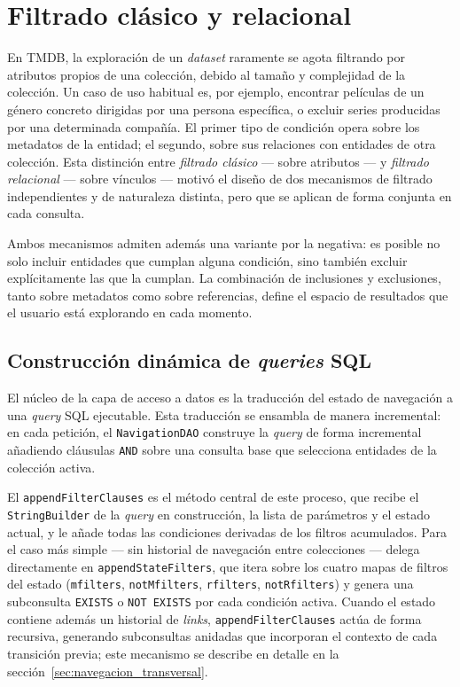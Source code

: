 \section{Filtrado clásico y relacional}
\label{sec:filtrado}

En TMDB, la exploración de un \textit{dataset} raramente se agota filtrando por atributos propios de
una colección, debido al tamaño y complejidad de la colección. Un caso de uso habitual es, por ejemplo,
encontrar películas de un género concreto dirigidas por una persona específica, o excluir series producidas por una
determinada compañía. El primer tipo de condición opera sobre los metadatos de la entidad; el segundo,
sobre sus relaciones con entidades de otra colección. Esta distinción entre \textit{filtrado
clásico} --- sobre atributos --- y \textit{filtrado relacional} --- sobre vínculos --- motivó el
diseño de dos mecanismos de filtrado independientes y de naturaleza distinta, pero que se aplican de forma
conjunta en cada consulta.

Ambos mecanismos admiten además una variante por la negativa: es posible no solo incluir entidades
que cumplan alguna condición, sino también excluir explícitamente las que la cumplan. La combinación de
inclusiones y exclusiones, tanto sobre metadatos como sobre referencias, define el espacio de
resultados que el usuario está explorando en cada momento.

    \subsection{Construcción dinámica de \textit{queries} SQL}

El núcleo de la capa de acceso a datos es la traducción del estado de navegación a una \textit{query}
SQL ejecutable. Esta traducción se ensambla de manera incremental: en cada petición, el
\texttt{NavigationDAO} construye la \textit{query} de forma incremental añadiendo cláusulas
\texttt{AND} sobre una consulta base que selecciona entidades de la colección activa.

El \texttt{appendFilterClauses} es el método central de este proceso, que recibe el  
\texttt{StringBuilder} de la \textit{query} en construcción, la lista de parámetros y el estado
actual, y le añade todas las condiciones derivadas de los filtros acumulados. Para el caso
más simple --- sin historial de navegación entre colecciones --- delega directamente en
\texttt{appendStateFilters}, que itera sobre los cuatro mapas de filtros del estado
(\texttt{mfilters}, \texttt{notMfilters}, \texttt{rfilters}, \texttt{notRfilters}) y
genera una subconsulta \texttt{EXISTS} o \texttt{NOT EXISTS} por cada condición activa.
Cuando el estado contiene además un historial de \textit{links}, \texttt{appendFilterClauses}
actúa de forma recursiva, generando subconsultas anidadas que incorporan el contexto de
cada transición previa; este mecanismo se describe en detalle en la
sección~\ref{sec:navegacion_transversal}.

